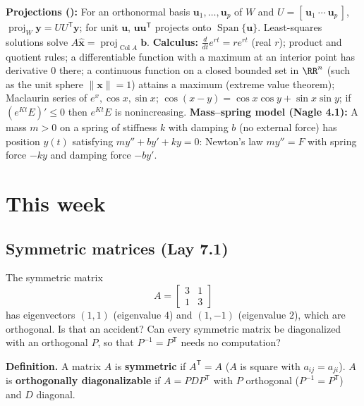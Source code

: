 \documentclass[10pt]{scrartcl}
\newcommand{\vv}[1]{\mathbf{#1}}
\DeclareMathOperator{\spn}{Span}
\DeclareMathOperator{\Col}{Col}
\DeclareMathOperator{\proj}{proj}
\begin{document}
\begin{enumerate}[label=(W\arabic*),leftmargin=2.8em,itemsep=4pt]
  \ii {}\textbf{Projections ():} For an orthonormal basis $\vv u_1,\dots,\vv u_p$ of $W$ and $U=[\,\vv u_1\ \cdots\ \vv u_p\,]$, $\proj_W\vv y=UU^{\mathsf T}\vv y$; for unit $\vv u$, $\vv u\vv u^{\mathsf T}$ projects onto $\spn\{\vv u\}$. Least-squares solutions solve $A\hat{\vv x}=\proj_{\Col A}\vv b$.
  \ii {}\textbf{Calculus:} $\frac{d}{dt}e^{rt}=re^{rt}$ (real $r$); product and quotient rules; a differentiable function with a maximum at an interior point has derivative $0$ there; a continuous function on a closed bounded set in $\RR^n$ (such as the unit sphere $\|\vv x\|=1$) attains a maximum (extreme value theorem); Maclaurin series of $e^x,\cos x,\sin x$; $\cos(x-y)=\cos x\cos y+\sin x\sin y$; if $(e^{Kt}E)'\le 0$ then $e^{Kt}E$ is nonincreasing.
  \ii {}\textbf{Mass--spring model (Nagle 4.1):} A mass $m>0$ on a spring of stiffness $k$ with damping $b$ (no external force) has position $y(t)$ satisfying $my''+by'+ky=0$: Newton's law $my''=F$ with spring force $-ky$ and damping force $-by'$.
\end{enumerate}

\section{This week}
\subsection{Symmetric matrices (Lay 7.1)}
\begin{qbox}
  The symmetric matrix
  \[
    A=\begin{bmatrix}3&1\\1&3\end{bmatrix}
  \]
  has eigenvectors $(1,1)$ (eigenvalue $4$) and $(1,-1)$ (eigenvalue $2$), which are orthogonal. Is that an accident? Can every symmetric matrix be diagonalized with an orthogonal $P$, so that $P^{-1}=P^{\mathsf T}$ needs no computation?
\end{qbox}

\noindent\textbf{Definition.} A matrix $A$ is \textbf{symmetric} if $A^{\mathsf T}=A$ ($A$ is square with $a_{ij}=a_{ji}$). $A$ is \textbf{orthogonally diagonalizable} if $A=PDP^{\mathsf T}$ with $P$ orthogonal ($P^{-1}=P^{\mathsf T}$) and $D$ diagonal.
\end{document}
